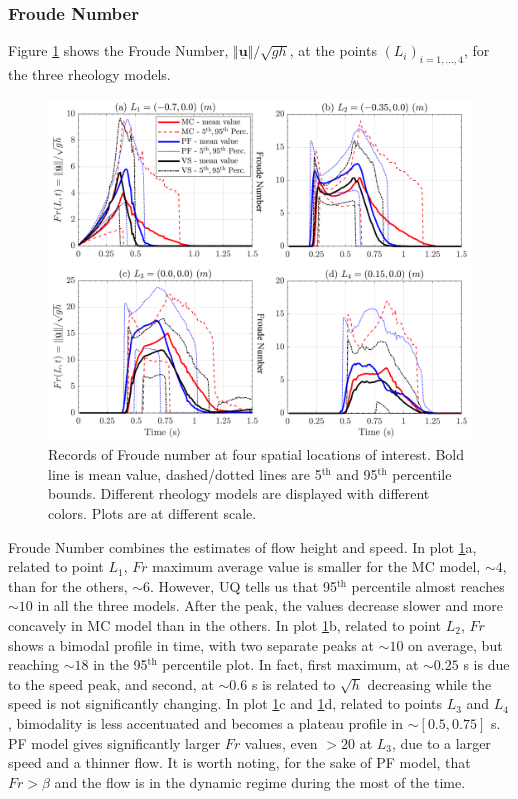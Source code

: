 \documentclass{article}
\begin{document}
\subsubsection{Froude Number}
Figure \ref{fig:Ramp-Fr} shows the Froude Number, $\Vert \underline{\mathbf{u}} \Vert/\sqrt{gh}$, at the points $(L_i)_{i=1,\dots,4}$, for the three rheology models.
\begin{figure}[H]
         \centering
        \includegraphics[width=1\textwidth]{InclinedPlane/LocalMeasurments/Froude.png}
        \caption{Records of Froude number at four spatial locations of interest. Bold line is mean value, dashed/dotted lines are 5$^{\mathrm{th}}$ and 95$^{\mathrm{th}}$ percentile bounds. Different rheology models are displayed with different colors. Plots are at different scale.}
        \label{fig:Ramp-Fr}
\end{figure}
Froude Number combines the estimates of flow height and speed. In plot \ref{fig:Ramp-Fr}a, related to point $L_1$, $Fr$ maximum average value is smaller for the MC model, $\sim 4$, than for the others, $\sim 6$. However, UQ tells us that 95$^{\mathrm{th}}$ percentile almost reaches $\sim 10$ in all the three models. After the peak, the values decrease slower and more concavely in MC model than in the others. In plot \ref{fig:Ramp-Fr}b, related to point $L_2$, $Fr$ shows a bimodal profile in time, with two separate peaks at $\sim 10$ on average, but reaching $\sim 18$ in the 95$^{\mathrm{th}}$ percentile plot. In fact, first maximum, at $\sim 0.25$ s is due to the speed peak, and second, at $\sim 0.6$ s is related to $\sqrt{h}$ decreasing while the speed is not significantly changing. In plot \ref{fig:Ramp-Fr}c and \ref{fig:Ramp-Fr}d, related to points $L_3$ and $L_4$, bimodality is less accentuated and becomes a plateau profile in $\sim [0.5, 0.75]$ s. PF model gives significantly larger $Fr$ values, even $>20$ at $L_3$, due to a larger speed and a thinner flow. It is worth noting, for the sake of PF model, that $Fr>\beta$ and the flow is in the dynamic regime during the most of the time.
\end{document}
